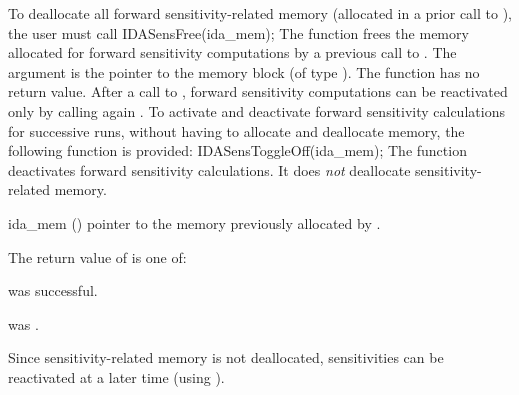 To deallocate all forward sensitivity-related memory (allocated in a prior call
to ), the user must call
{
  IDASensFree(ida\_mem);
}
{
  The function  frees the memory allocated for forward sensitivity 
  computations by a previous call to .
}
{
  The argument is the pointer to the {\idas} memory block (of type ).
}
{
  The function  has no return value.
}
{
  After a call to , forward sensitivity computations can be reactivated
  only by calling again .
}
To activate and deactivate forward sensitivity calculations for successive {\idas} runs,
without having to allocate and deallocate memory, the following function is provided:
{
  IDASensToggleOff(ida\_mem);
}
{
  The function  deactivates forward sensitivity 
  calculations. It does {\em not} deallocate sensitivity-related memory.
}
{
  \begin{args}
  \item[ida\_mem] ()
    pointer to the memory previously allocated by .
  \end{args}
}
{
  The return value  of  is one of:
  \begin{args}
  \item[\Id{IDA\_SUCCESS}] 
     was successful.
  \item[\Id{IDA\_MEM\_NULL}] 
     was .
  \end{args}
}
{
  Since sensitivity-related memory is not deallocated, sensitivities can
  be reactivated at a later time (using ).
}

